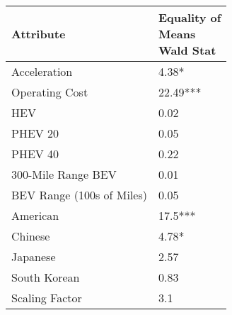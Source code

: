 \begin{tabular}{ll}
\toprule
                Attribute & \makecell{Equality of \\ Means \\ Wald Stat} \\
\midrule
             Acceleration &                       \multirow{1}{*}{4.38*} \\
           Operating Cost &                    \multirow{1}{*}{22.49***} \\
                      HEV &                        \multirow{1}{*}{0.02} \\
                  PHEV 20 &                        \multirow{1}{*}{0.05} \\
                  PHEV 40 &                        \multirow{1}{*}{0.22} \\
       300-Mile Range BEV &                        \multirow{1}{*}{0.01} \\
BEV Range (100s of Miles) &                        \multirow{1}{*}{0.05} \\
                 American &                     \multirow{1}{*}{17.5***} \\
                  Chinese &                       \multirow{1}{*}{4.78*} \\
                 Japanese &                        \multirow{1}{*}{2.57} \\
             South Korean &                        \multirow{1}{*}{0.83} \\
           Scaling Factor &                         \multirow{1}{*}{3.1} \\
\bottomrule
\end{tabular}

